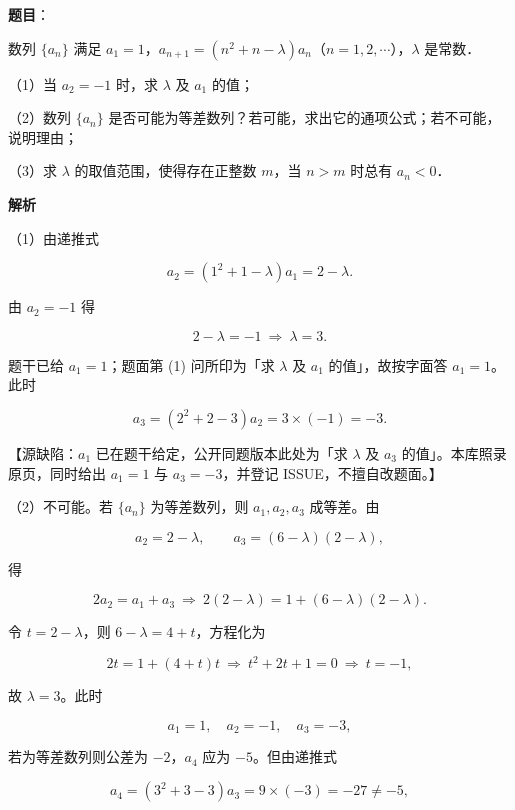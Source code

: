 \begin{answer}

\textbf{题目}：

数列 $\{a_n\}$ 满足 $a_1=1$，$a_{n+1}=(n^2+n-\lambda)a_n$（$n=1,2,\cdots$），$\lambda$ 是常数．

（1）当 $a_2=-1$ 时，求 $\lambda$ 及 $a_1$ 的值；

（2）数列 $\{a_n\}$ 是否可能为等差数列？若可能，求出它的通项公式；若不可能，说明理由；

（3）求 $\lambda$ 的取值范围，使得存在正整数 $m$，当 $n>m$ 时总有 $a_n<0$．

\textbf{解析}

（1）由递推式

\nopagebreak[4]
\[a_2=(1^2+1-\lambda)a_1=2-\lambda .\]

由 $a_2=-1$ 得

\nopagebreak[4]
\[2-\lambda=-1\ \Longrightarrow\ \lambda=3 .\]

题干已给 $a_1=1$；题面第 (1) 问所印为「求 $\lambda$ 及 $a_1$ 的值」，故按字面答 $a_1=1$。此时

\nopagebreak[4]
\[a_3=(2^2+2-3)a_2=3\times(-1)=-3 .\]

【源缺陷：$a_1$ 已在题干给定，公开同题版本此处为「求 $\lambda$ 及 $a_3$ 的值」。本库照录原页，同时给出 $a_1=1$ 与 $a_3=-3$，并登记 ISSUE，不擅自改题面。】

（2）不可能。若 $\{a_n\}$ 为等差数列，则 $a_1,a_2,a_3$ 成等差。由

\nopagebreak[4]
\[a_2=2-\lambda,\qquad a_3=(6-\lambda)(2-\lambda),\]

得

\nopagebreak[4]
\[2a_2=a_1+a_3\ \Longrightarrow\ 2(2-\lambda)=1+(6-\lambda)(2-\lambda).\]

令 $t=2-\lambda$，则 $6-\lambda=4+t$，方程化为

\nopagebreak[4]
\[2t=1+(4+t)t\ \Longrightarrow\ t^2+2t+1=0\ \Longrightarrow\ t=-1,\]

故 $\lambda=3$。此时

\nopagebreak[4]
\[a_1=1,\quad a_2=-1,\quad a_3=-3,\]

若为等差数列则公差为 $-2$，$a_4$ 应为 $-5$。但由递推式

\nopagebreak[4]
\[a_4=(3^2+3-3)a_3=9\times(-3)=-27\neq-5,\]


\end{answer}
